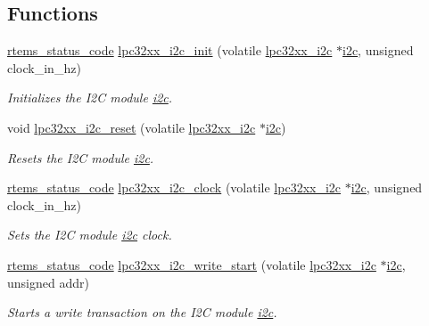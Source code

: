 \subsection*{Functions}
\begin{DoxyCompactItemize}
\item 
\mbox{\hyperlink{group__ClassicStatus_ga545d41846817eaba6143d52ee4d9e9fe}{rtems\+\_\+status\+\_\+code}} \mbox{\hyperlink{group__lpc32xx__i2c_ga3cdd34b373a9c1d04a7686f459fbc3e0}{lpc32xx\+\_\+i2c\+\_\+init}} (volatile \mbox{\hyperlink{structlpc32xx__i2c}{lpc32xx\+\_\+i2c}} $\ast$\mbox{\hyperlink{structi2c}{i2c}}, unsigned clock\+\_\+in\+\_\+hz)
\begin{DoxyCompactList}\small\item\em Initializes the I2C module {\itshape \mbox{\hyperlink{structi2c}{i2c}}}. \end{DoxyCompactList}\item 
\mbox{\label{group__lpc32xx__i2c_ga9b92b575a067b9881b60465aefe3d29f}} 
void \mbox{\hyperlink{group__lpc32xx__i2c_ga9b92b575a067b9881b60465aefe3d29f}{lpc32xx\+\_\+i2c\+\_\+reset}} (volatile \mbox{\hyperlink{structlpc32xx__i2c}{lpc32xx\+\_\+i2c}} $\ast$\mbox{\hyperlink{structi2c}{i2c}})
\begin{DoxyCompactList}\small\item\em Resets the I2C module {\itshape \mbox{\hyperlink{structi2c}{i2c}}}. \end{DoxyCompactList}\item 
\mbox{\hyperlink{group__ClassicStatus_ga545d41846817eaba6143d52ee4d9e9fe}{rtems\+\_\+status\+\_\+code}} \mbox{\hyperlink{group__lpc32xx__i2c_gae01a777a930c867e069dd94a377532a0}{lpc32xx\+\_\+i2c\+\_\+clock}} (volatile \mbox{\hyperlink{structlpc32xx__i2c}{lpc32xx\+\_\+i2c}} $\ast$\mbox{\hyperlink{structi2c}{i2c}}, unsigned clock\+\_\+in\+\_\+hz)
\begin{DoxyCompactList}\small\item\em Sets the I2C module {\itshape \mbox{\hyperlink{structi2c}{i2c}}} clock. \end{DoxyCompactList}\item 
\mbox{\hyperlink{group__ClassicStatus_ga545d41846817eaba6143d52ee4d9e9fe}{rtems\+\_\+status\+\_\+code}} \mbox{\hyperlink{group__lpc32xx__i2c_ga6c2c603e12d63fc05c61c2ed48f10176}{lpc32xx\+\_\+i2c\+\_\+write\+\_\+start}} (volatile \mbox{\hyperlink{structlpc32xx__i2c}{lpc32xx\+\_\+i2c}} $\ast$\mbox{\hyperlink{structi2c}{i2c}}, unsigned addr)
\begin{DoxyCompactList}\small\item\em Starts a write transaction on the I2C module {\itshape \mbox{\hyperlink{structi2c}{i2c}}}. \end{DoxyCompactList}\item 

\end{DoxyCompactItemize}
